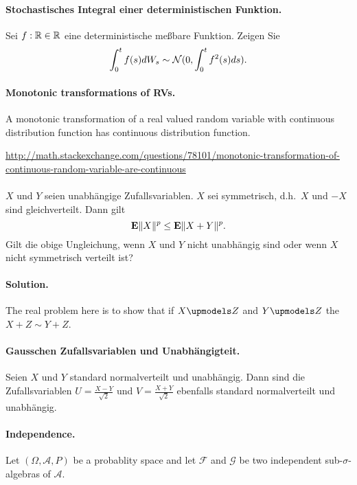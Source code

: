 

\paragraph{Stochastisches Integral einer deterministischen Funktion. } Sei
$f: \mathbb R\in\mathbb R$ eine deterministische meßbare Funktion. Zeigen Sie 
\begin{equation}
    \int_{0}^{t} f(s) d W_s \sim \mathcal N(0, \int_{0}^{t} f^2(s) ds). 
\end{equation}


\paragraph{Monotonic transformations of RVs.} A monotonic transformation of
a real valued random variable with continuous distribution function has
continuous distribution function. 

\url{http://math.stackexchange.com/questions/78101/monotonic-transformation-of-continuous-random-variable-are-continuous}


\paragraph{} $X$ und $Y$ seien unabhängige Zufallsvariablen. $X$ sei symmetrisch, 
d.h.\ $X$ und $-X$ sind gleichverteilt. Dann gilt
\begin{equation}
    \mathbf{E} \| X \|^p \leq \mathbf{E} \| X + Y \|^p.
\end{equation}
Gilt die obige Ungleichung, wenn $X$ und $Y$ nicht unabhängig sind oder wenn 
$X$ nicht symmetrisch verteilt ist?


\paragraph*{Solution. } The real problem here is to show that if $X \upmodels Z$
and $Y \upmodels Z$ the $X+Z \sim Y+Z$. 


\paragraph{Gausschen Zufallsvariablen und Unabhängigteit. } Seien $X$ und $Y$
standard normalverteilt und unabhängig. Dann sind die Zufallsvariablen $U =
\frac{X-Y}{\sqrt{2}}$ und $V=\frac{X+Y}{\sqrt{2}}$ ebenfalls standard
normalverteilt und unabhängig. 


\paragraph{Independence. }
Let $(\Omega, \mathcal A, P)$ be a probablity space and let $\mathcal F$ and
$\mathcal G$ be two independent sub-$\sigma$-algebras of $\mathcal A$.

